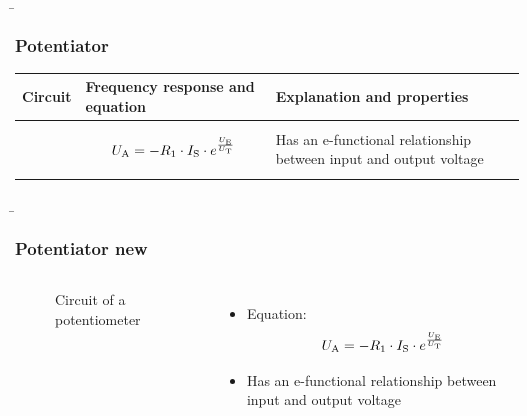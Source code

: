 
\begin{frame}
    \b{
        \frametitle{Potentiator}
    \centering
    \begin{table}[ht]
    \label{tab:Potenzierer}
    \begin{tabular}{|m{}|m{}|m{}|}
    \hline
    Circuit & Frequency response and equation & Explanation and properties\\ %
    \hline
    \vspace{0.5cm}
    \centering
    
    &
    \begin{center}
    \[
    U_{\textnormal{A}} =-R_1\cdot I_{\textnormal{S}} \cdot e^{\frac{U_{\textnormal{E}}}{U_{\textnormal{T}}}}
    \]
    \end{center} 
    & 
    Has an e-functional relationship between input and output voltage \\
    \hline
    \end{tabular}
    \end{table}
    }
\end{frame}

\begin{frame}
    \renewcommand{\figurename}{Figure}
    \b{
    \frametitle{Potentiator new}
    \begin{columns}
        \centering
        \begin{figure}
        \centering
        {}
        \caption{Circuit of a potentiometer}

\end{figure}

        \raggedleft
        \begin{itemize}
            \item Equation:
           \[
    U_{\textnormal{A}} =-R_1\cdot I_{\textnormal{S}} \cdot e^{\frac{U_{\textnormal{E}}}{U_{\textnormal{T}}}}
    \]
        \item Has an e-functional relationship between input and output voltage
    \end{itemize}
    \end{columns}
    }
\end{frame}


